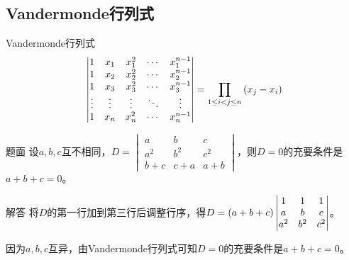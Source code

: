 \documentclass[9pt,xcolor=svgnames]{beamer} %
\begin{document}
\subsection*{Vandermonde行列式}
\begin{frame}
    \begin{block}{Vandermonde行列式}
        \begin{equation*}
            \begin{vmatrix}
                1      & x_1    & x_1^2   & \cdots & x_1^{n-1}   \\
                1      & x_2    & x_2^2   & \cdots & x_2^{n-1}   \\
                1      & x_3    & x_3^2   & \cdots & x_3^{n-1}   \\
                \vdots & \vdots & \vdots  & \ddots & \vdots      \\
                1      & x_{n}  & x_{n}^2 & \cdots & x_{n}^{n-1} \\
            \end{vmatrix}=\prod_{1\leq i<j\leq n}\left( x_j-x_i \right)
        \end{equation*}
    \end{block}
    \pause
    \begin{block}{题面}
        设\(a,b,c\)互不相同，\(D=\begin{vmatrix}a&b&c\\a^2&b^2&c^2\\b+c&c+a&a+b\end{vmatrix}\)，则\(D=0\)的充要条件是\(a+b+c=0\)。
    \end{block}
    \pause
    \begin{block}{解答}
        将\(D\)的第一行加到第三行后调整行序，得\(D=\left( a+b+c \right)\begin{vmatrix}1&1&1\\a&b&c\\a^2&b^2&c^2\end{vmatrix}\)。

        因为\(a,b,c\)互异，由Vandermonde行列式可知\(D=0\)的充要条件是\(a+b+c=0\)。
    \end{block}
\end{frame}
\end{document}
